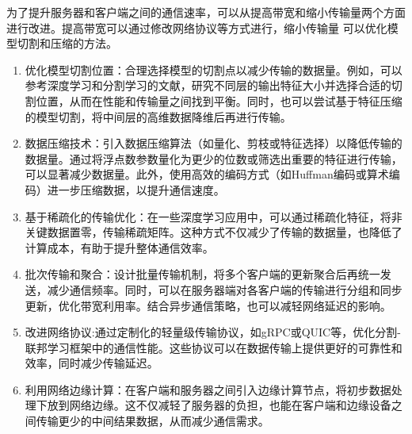 为了提升服务器和客户端之间的通信速率，可以从提高带宽和缩小传输量两个方面进行改进。提高带宽可以通过修改网络协议等方式进行，缩小传输量
可以优化模型切割和压缩的方法。
\begin{enumerate}

    \item 优化模型切割位置：合理选择模型的切割点以减少传输的数据量。例如，可以参考深度学习和分割学习的文献，研究不同层的输出特征大小并选择合适的切割位置，从而在性能和传输量之间找到平衡。同时，也可以尝试基于特征压缩的模型切割，将中间层的高维数据降维后再进行传输。

    \item 数据压缩技术：引入数据压缩算法（如量化、剪枝或特征选择）以降低传输的数据量。通过将浮点数参数量化为更少的位数或筛选出重要的特征进行传输，可以显著减少数据量。此外，使用高效的编码方式（如Huffman编码或算术编码）进一步压缩数据，以提升通信速度。

    \item 基于稀疏化的传输优化：在一些深度学习应用中，可以通过稀疏化特征，将非关键数据置零，传输稀疏矩阵。这种方式不仅减少了传输的数据量，也降低了计算成本，有助于提升整体通信效率。

    \item 批次传输和聚合：设计批量传输机制，将多个客户端的更新聚合后再统一发送，减少通信频率。同时，可以在服务器端对各客户端的传输进行分组和同步更新，优化带宽利用率。结合异步通信策略，也可以减轻网络延迟的影响。

    \item 改进网络协议:通过定制化的轻量级传输协议，如gRPC或QUIC等，优化分割-联邦学习框架中的通信性能。这些协议可以在数据传输上提供更好的可靠性和效率，同时减少传输延迟。

    \item 利用网络边缘计算：在客户端和服务器之间引入边缘计算节点，将初步数据处理下放到网络边缘。这不仅减轻了服务器的负担，也能在客户端和边缘设备之间传输更少的中间结果数据，从而减少通信需求。
\end{enumerate}